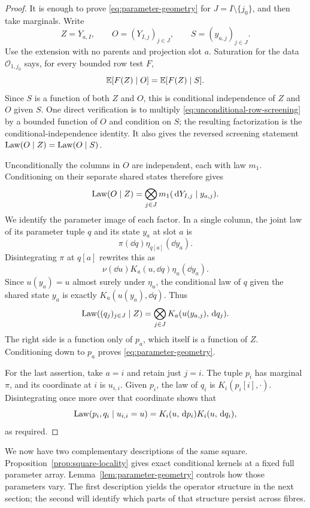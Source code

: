 \begin{proof}
It is enough to prove \eqref{eq:parameter-geometry} for
$J=I\setminus\{j_0\}$, and then take marginals.  Write
\[
 Z=Y_{a,I},\qquad O=(Y_{I,j})_{j\in J},\qquad
 S=(y_{a,j})_{j\in J}.
\]
Use the extension with no parents and projection slot $a$.
Saturation for the data $\mathcal O_{1,j_0}$ says, for every bounded
row test $F$,
\begin{equation}\label{eq:unconditional-row-screening}
 \mathbb E[F(Z)\mid O]=\mathbb E[F(Z)\mid S].
\end{equation}
Since $S$ is a function of both $Z$ and $O$, this is conditional
independence of $Z$ and $O$ given $S$.  One direct verification is to
multiply \eqref{eq:unconditional-row-screening} by a bounded function
of $O$ and condition on $S$; the resulting factorization is the
conditional-independence identity.  It also gives the reversed
screening statement $\operatorname{Law}(O\mid Z)=\operatorname{Law}(O\mid S)$.

Unconditionally the columns in $O$ are independent, each with law
$m_1$.  Conditioning on their separate shared states therefore gives
\[
 \operatorname{Law}(O\mid Z)
 =\bigotimes_{j\in J}m_1(\,\mathrm d Y_{I,j}\mid y_{a,j}).
\]
We identify the parameter image of each factor.  In a single column,
the joint law of its parameter tuple $q$ and its state $y_a$ at slot
$a$ is
\begin{equation}\label{eq:shared-state-law}
 \pi(\dd q)\eta_{q[a]}(\dd y_a).
\end{equation}
Disintegrating $\pi$ at $q[a]$ rewrites this as
\[
 \nu(\dd u)K_a(u,\dd q)\eta_u(\dd y_a).
\]
Since $u(y_a)=u$ almost surely under $\eta_u$, the conditional law
of $q$ given the shared state $y_a$ is exactly
$K_a(u(y_a),\dd q)$.  Thus
\[
 \operatorname{Law}((q_j)_{j\in J}\mid Z)
 =\bigotimes_{j\in J}K_a(u(y_{a,j}),\,\mathrm d q_j).
\]
The right side is a function only of $p_a$, which itself is a
function of $Z$.  Conditioning down to $p_a$ proves
\eqref{eq:parameter-geometry}.

For the last assertion, take $a=i$ and retain just $j=i$.  The tuple
$p_i$ has marginal $\pi$, and its coordinate at $i$ is $u_{i,i}$.
Given $p_i$, the law of $q_i$ is $K_i(p_i[i],\cdot)$.
Disintegrating once more over that coordinate shows that
\[
 \operatorname{Law}(p_i,q_i\mid u_{i,i}=u)
 =K_i(u,\,\mathrm d p_i)K_i(u,\,\mathrm d q_i),
\]
as required.
\end{proof}

We now have two complementary descriptions of the same square.
Proposition~\ref{prop:square-locality} gives exact conditional kernels
at a fixed full parameter array.  Lemma~\ref{lem:parameter-geometry}
controls how those parameters vary.  The first description yields the
operator structure in the next section; the second will identify which
parts of that structure persist across fibres.
